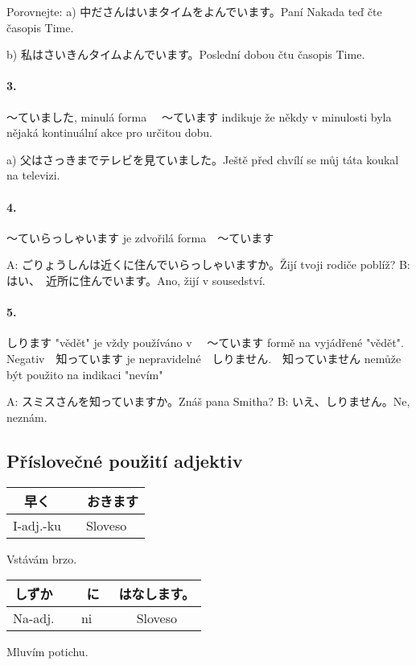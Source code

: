Porovnejte:
a) 中ださんはいまタイムをよんでいます。Paní Nakada teď čte časopis Time.

b) 私はさいきんタイムよんでいます。Poslední dobou čtu časopis Time.

\paragraph{3.}〜ていました, minulá forma 　〜ています indikuje že někdy v minulosti byla nějaká kontinuální akce pro určitou dobu.　

a) 父はさっきまでテレビを見ていました。Ještě před chvílí se můj táta koukal na televizi.


\paragraph{4.}〜ていらっしゃいます je zdvořilá forma　〜ています

A: ごりょうしんは近くに住んでいらっしゃいますか。Žijí tvoji rodiče poblíž?
B: はい、　近所に住んでいます。Ano, žijí v sousedství.

\paragraph{5.} しります "vědět" je vždy používáno v 　〜ています formě na vyjádřené "vědět". Negativ　知っています je nepravidelné　しりません.　知っていません nemůže být použito na indikaci "nevím"

A: スミスさんを知っていますか。Znáš pana Smitha?
B: いえ、しりません。Ne, neznám.


\subsection{Příslovečné použití adjektiv}
\begin{center}
\begin{tabular}{|c|c|}
\hline
早く&　おきます\\
\hline
I-adj.-ku&Sloveso\\
\hline
\end{tabular}
\end{center}
Vstávám brzo.

\vspace{1 cm}
\begin{center}
\begin{tabular}{|c|c|c|}
\hline
しずか&　に　&はなします。\\
\hline
Na-adj.&ni&Sloveso\\
\hline
\end{tabular}
\end{center}
Mluvím potichu.

